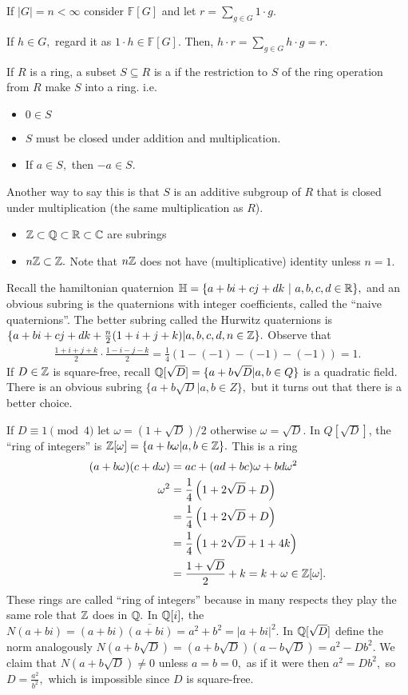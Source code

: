 \documentclass[a4paper]{article}
\begin{document}
\begin{example}
    If $|G|=n<\infty$ consider $\mathbb F[G]$ and let $r=\sum_{g\in G}1\cdot g.$

    If $h\in G,$ regard it as $1\cdot h\in\mathbb F[G].$ Then, $h\cdot r=\sum_{g\in G}h\cdot g=r.$
\end{example}
\begin{definition}[Subring]
    If $R$ is a ring, a subset $S\subseteq R$ is a  if the restriction to $S$ of the ring operation from $R$ make $S$ into a ring. i.e.
    \begin{itemize}
        \item $0\in S$
        \item $S$ must be closed under addition and multiplication.
        \item If $a\in S,$ then $-a\in S.$
    \end{itemize}
    Another way to say this is that $S$ is an additive subgroup of $R$ that is closed under multiplication (the same multiplication as $R$).
\end{definition}
\begin{itemize}
    \item $\mathbb{Z}\subset\mathbb{Q}\subset\mathbb{R}\subset\mathbb{C}$ are subrings
    \item $n\mathbb{Z}\subset\mathbb{Z}.$ Note that $n\mathbb{Z}$ does not have (multiplicative) identity unless $n=1.$
\end{itemize}
Recall the hamiltonian quaternion $\mathbb H=\{a+bi+cj+dk~|~a,b,c,d\in\mathbb{R}\},$ and an obvious subring is the quaternions with integer coefficients, called the ``naive quaternions''. The better subring called the Hurwitz quaternions is $\{a+bi+cj+dk+\frac{n}{2}(1+i+j+k)|a,b,c,d,n\in\mathbb{Z}\}.$ Observe that \begin{align}
    \frac{1+i+j+k}{2}\cdot\frac{1-i-j-k}{2}=\frac{1}{4}\left(1-(-1)-(-1)-(-1)\right)=1.
\end{align}
If $D\in \mathbb{Z}$ is square-free, recall $\mathbb{Q}[\sqrt D]=\{a+b\sqrt{D}|a,b\in Q\}$ is a quadratic field. There is an obvious subring $\{a+b\sqrt D|a,b\in Z\},$ but it turns out that there is a better choice. 

If $D\equiv 1\pmod 4$ let $\omega=(1+\sqrt D)/2$ otherwise $\omega=\sqrt D.$ In $Q[\sqrt D]$, the ``ring of integers'' is $\mathbb{Z}[\omega]=\{a+b\omega|a,b\in\mathbb{Z}\}.$ This is a ring \begin{align}
    (a+b\omega)(c+d\omega)&=ac+(ad+bc)\omega+bd\omega^2\\
    \omega^2&=\frac{1}{4}\left(1+2\sqrt D+D\right)\\
    &=\frac{1}{4}\left(1+2\sqrt D+D\right)\\
    &=\frac{1}{4}\left(1+2\sqrt D+1+4k\right)\\
    &=\frac{1+\sqrt D}{2}+k=k+\omega\in\mathbb{Z}[\omega].
\end{align}
These rings are called ``ring of integers'' because in many respects they play the same role that $\mathbb{Z}$ does in $\mathbb{Q}.$ In $\mathbb{Q}[i],$ the $N(a+bi)=(a+bi)\overline{(a+bi)}=a^2+b^2=|a+bi|^2.$ In $\mathbb{Q}[\sqrt D]$ define the norm analogously $N(a+b\sqrt D)=(a+b\sqrt D)(a-b\sqrt D)=a^2-Db^2.$ We claim that $N(a+b\sqrt D)\neq0$ unless $a=b=0,$ as if it were then $a^2=Db^2,$ so $D=\frac{a^2}{b^2},$ which is impossible since $D$ is square-free.
\end{document}
